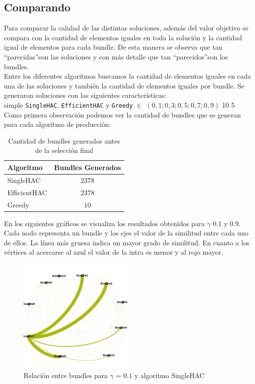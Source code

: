 \subsection{Comparando}
Para comparar la calidad de las distintas soluciones, además del valor objetivo se compara con la cantidad de elementos iguales en toda la solución y la cantidad igual de elementos para cada bundle. De esta manera se observa que tan \textquotedblleft parecidas\textquotedblright son las soluciones y con más detalle que tan \textquotedblleft parecidos\textquotedblright son los bundles.\\ 
Entre los diferentes algoritmos buscamos la cantidad de elementos iguales en cada una de las soluciones y también la cantidad de elementos iguales por bundle. Se generaron soluciones con las siguientes características:\\
\Solucion
{}
{simple}
{\texttt{SingleHAC}, \texttt{EfficientHAC} y \texttt{Greedy}}
{$\in$ $(0,1; 0,3; 0,5; 0,7; 0,9)$}
{10}
{5}
Como primera observación podemos ver la cantidad de bundles que se generan para cada algoritmo de 
producción:\\
\begin{table}[h]
  \centering
  \resizebox{0.5\textwidth}{!} {
    \begin{tabular}{|lc|}
    \hline
    Algoritmo & Bundles Generados \\
    \hline
    SingleHAC & $2378$ \\
    EfficientHAC & $2378$ \\
    Greedy & $10$ \\
    \hline
    \end{tabular}
  }
    \caption {Cantidad de bundles generados antes de la selección final}
\end{table}

En los siguientes gráficos se visualiza los resultados obtenidos para $\gamma$ 0.1 y 0.9. Cada 
nodo representa un bundle y los ejes el valor de la similitud entre cada uno de ellos. La línea más 
gruesa indica un mayor grado de similitud. En cuanto a los vértices al acercarse al azul el valor 
de la intra es menor y al rojo mayor.

\begin{figure}[H]
  \centering
    \includegraphics[width=0.5\textwidth]{resultados/papers/intra_inter/hac01.png}
  \caption{Relación entre bundles para $\gamma$ = $0.1$ y algoritmo SingleHAC}
  \label{res:img-papers-gamma01-hac}
\end{figure}

